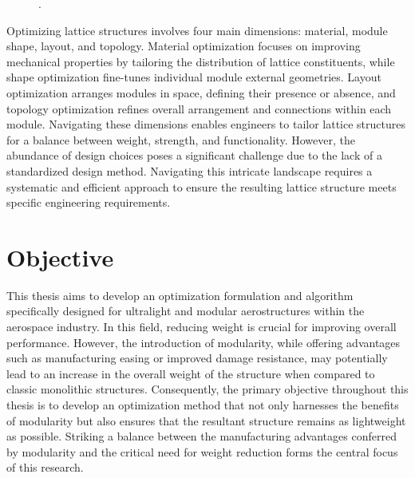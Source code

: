 \begin{figure}
    \hspace*{\fill}
    \hfill
    \hspace*{\fill}
    \caption{\cite{cheung_reversibly_2013} \cite{costa_algorithmic_2020}.}
    \label{fig:01_fab}
\end{figure}

Optimizing lattice structures involves four main dimensions: material, module shape, layout, and topology. Material optimization focuses on improving mechanical properties by tailoring the distribution of lattice constituents, while shape optimization fine-tunes individual module external geometries. Layout optimization arranges modules in space, defining their presence or absence, and topology optimization refines overall arrangement and connections within each module. Navigating these dimensions enables engineers to tailor lattice structures for a balance between weight, strength, and functionality. However, the abundance of design choices poses a significant challenge due to the lack of a standardized design method. Navigating this intricate landscape requires a systematic and efficient approach to ensure the resulting lattice structure meets specific engineering requirements. 

\section*{Objective}
This thesis aims to develop an optimization formulation and algorithm specifically designed for ultralight and modular aerostructures within the aerospace industry. In this field, reducing weight is crucial for improving overall performance. However, the introduction of modularity, while offering advantages such as manufacturing easing or improved damage resistance, may potentially lead to an increase in the overall weight of the structure when compared to classic monolithic structures. Consequently, the primary objective throughout this thesis is to develop an optimization method that not only harnesses the benefits of modularity but also ensures that the resultant structure remains as lightweight as possible. Striking a balance between the manufacturing advantages conferred by modularity and the critical need for weight reduction forms the central focus of this research.

